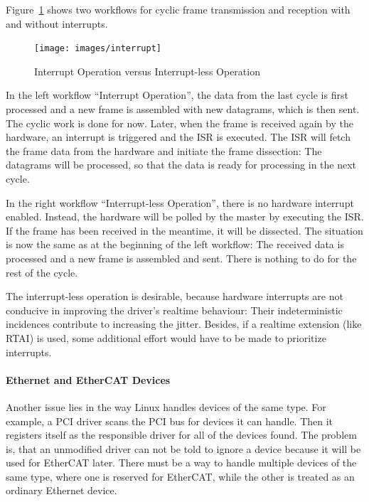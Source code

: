 \documentclass[a4paper,12pt,BCOR6mm,bibtotoc,idxtotoc]{scrbook}
\begin{document}
Figure~\ref{fig:interrupt} shows two workflows for cyclic frame transmission
and reception with and without interrupts.

\begin{figure}[htbp]
  \centering
  \texttt{[image: images/interrupt]}
  \caption{Interrupt Operation versus Interrupt-less Operation}
  \label{fig:interrupt}
\end{figure}

In the left workflow ``Interrupt Operation'', the data from the last cycle is
first processed and a new frame is assembled with new datagrams, which is then
sent.  The cyclic work is done for now.  Later, when the frame is received
again by the hardware, an interrupt is triggered and the ISR is executed. The
ISR will fetch the frame data from the hardware and initiate the frame
dissection: The datagrams will be processed, so that the data is ready for
processing in the next cycle.

In the right workflow ``Interrupt-less Operation'', there is no hardware
interrupt enabled.  Instead, the hardware will be polled by the master by
executing the ISR. If the frame has been received in the meantime, it will be
dissected. The situation is now the same as at the beginning of the left
workflow: The received data is processed and a new frame is assembled and
sent. There is nothing to do for the rest of the cycle.

The interrupt-less operation is desirable, because hardware interrupts are not
conducive in improving the driver's realtime behaviour: Their indeterministic
incidences contribute to increasing the jitter. Besides, if a realtime
extension (like RTAI) is used, some additional effort would have to be made to
prioritize interrupts.

\paragraph{Ethernet and EtherCAT Devices} Another issue lies in the way Linux
handles devices of the same type.  For example, a
PCI driver
scans the PCI bus for devices it can handle. Then it registers itself as the
responsible driver for all of the devices found. The problem is, that an
unmodified driver can not be told to ignore a device because it will be used
for EtherCAT later. There must be a way to handle multiple devices of the same
type, where one is reserved for EtherCAT, while the other is treated as an
ordinary Ethernet device.
\end{document}
